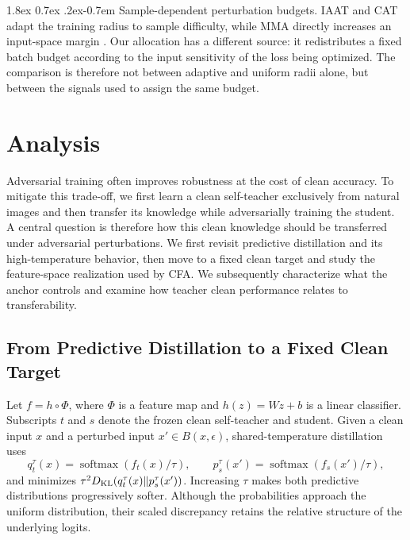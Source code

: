 \documentclass{article} %
\makeatletter
\theoremstyle{plain}
\renewcommand{\paragraph}{\@startsection{paragraph}{4}{\z@}%
  {1.8ex \@plus 0.7ex \@minus .2ex}{-0.7em}%
  {\normalfont\normalsize\bfseries}}
\makeatother
\begin{document}
\paragraph{Sample-dependent perturbation budgets.}
IAAT and CAT adapt the training radius to sample difficulty, while MMA directly increases an
input-space margin \citep{iaat,cat,mma}. Our allocation has a different source: it redistributes a
fixed batch budget according to the input sensitivity of the loss being optimized. The comparison is
therefore not between adaptive and uniform radii alone, but between the signals used to assign the
same budget.


\section{Analysis}
\label{sec:analysis}

Adversarial training often improves robustness at the cost of clean accuracy.
To mitigate this trade-off, we first learn a clean self-teacher exclusively
from natural images and then transfer its knowledge while adversarially
training the student. A central question is therefore how this clean
knowledge should be transferred under adversarial perturbations. We first
revisit predictive distillation and its high-temperature behavior, then move
to a fixed clean target and study the feature-space realization used by CFA.
We subsequently characterize what the anchor controls and examine how teacher
clean performance relates to transferability.

\subsection{From Predictive Distillation to a Fixed Clean Target}
\label{sec:fragile}

Let \(f=h\circ\Phi\), where \(\Phi\) is a feature map and
\(h(z)=Wz+b\) is a linear classifier. Subscripts \(t\) and \(s\) denote the
frozen clean self-teacher and student. Given a clean input \(x\) and a
perturbed input \(x'\in B(x,\epsilon)\), shared-temperature distillation uses
\begin{equation}
q_t^\tau(x)=\operatorname{softmax}(f_t(x)/\tau),\qquad
p_s^\tau(x')=\operatorname{softmax}(f_s(x')/\tau),
\end{equation}
and minimizes
\(\tau^2D_{\rm KL}(q_t^\tau(x)\|p_s^\tau(x'))\).
Increasing \(\tau\) makes both predictive distributions progressively softer.
Although the probabilities approach the uniform distribution, their scaled
discrepancy retains the relative structure of the underlying logits.
\end{document}
